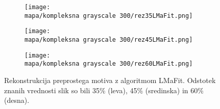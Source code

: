 \begin{figure}[!ht]
    \begin{subfigure}{0.325\linewidth}
        \texttt{[image: \\mapa/kompleksna grayscale 300/rez35LMaFit.png]}
    \end{subfigure}
    \hfill
    \begin{subfigure}{0.325\linewidth}
        \texttt{[image: \\mapa/kompleksna grayscale 300/rez45LMaFit.png]}
    \end{subfigure}
    \hfill
    \begin{subfigure}{0.325\linewidth}
        \texttt{[image: \\mapa/kompleksna grayscale 300/rez60LMaFit.png]}
    \end{subfigure}
    \caption{Rekonstrukcija preprostega motiva z algoritmom LMaFit. Odstotek znanih vrednosti slik so bili 35\% (leva), 45\% (sredinska) in 60\% (desna).}
\end{figure}